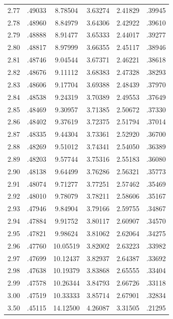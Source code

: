 \begin{minipage}{0.49\textwidth}
\begin{tabular}{c|c|c|c|c|c}
        2.77 & .49033 & 8.78504 & 3.63274 & 2.41829 & .39945 \\
        2.78 & .48960 & 8.84979 & 3.64306 & 2.42922 & .39610 \\
        2.79 & .48888 & 8.91477 & 3.65333 & 2.44017 & .39277 \\
        2.80 & .48817 & 8.97999 & 3.66355 & 2.45117 & .38946 \\
        2.81 & .48746 & 9.04544 & 3.67371 & 2.46221 & .38618 \\
        2.82 & .48676 & 9.11112 & 3.68383 & 2.47328 & .38293 \\
        2.83 & .48606 & 9.17704 & 3.69388 & 2.48439 & .37970 \\
        2.84 & .48538 & 9.24319 & 3.70389 & 2.49553 & .37649 \\
        2.85 & .48469 & 9.30957 & 3.71385 & 2.50672 & .37330 \\
        2.86 & .48402 & 9.37619 & 3.72375 & 2.51794 & .37014 \\
        2.87 & .48335 & 9.44304 & 3.73361 & 2.52920 & .36700 \\
        2.88 & .48269 & 9.51012 & 3.74341 & 2.54050 & .36389 \\
        2.89 & .48203 & 9.57744 & 3.75316 & 2.55183 & .36080 \\
        2.90 & .48138 & 9.64499 & 3.76286 & 2.56321 & .35773 \\
        2.91 & .48074 & 9.71277 & 3.77251 & 2.57462 & .35469 \\
        2.92 & .48010 & 9.78079 & 3.78211 & 2.58606 & .35167 \\
        2.93 & .47946 & 9.84904 & 3.79166 & 2.59755 & .34867 \\
        2.94 & .47884 & 9.91752 & 3.80117 & 2.60907 & .34570 \\
        2.95 & .47821 & 9.98624 & 3.81062 & 2.62064 & .34275 \\
        2.96 & .47760 & 10.05519 & 3.82002 & 2.63223 & .33982 \\
        2.97 & .47699 & 10.12437 & 3.82937 & 2.64387 & .33692 \\
        2.98 & .47638 & 10.19379 & 3.83868 & 2.65555 & .33404 \\
        2.99 & .47578 & 10.26344 & 3.84793 & 2.66726 & .33118 \\
        3.00 & .47519 & 10.33333 & 3.85714 & 2.67901 & .32834 \\
        3.50 & .45115 & 14.12500 & 4.26087 & 3.31505 & .21295 \\

\end{tabular}
\end{minipage}
